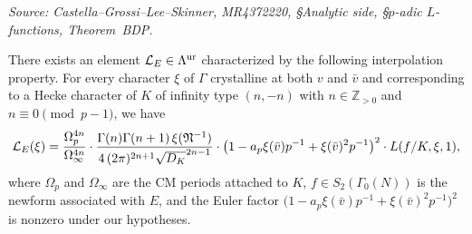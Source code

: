 \begin{theorem}
  \label{thm:BDP}
  \textit{Source: Castella--Grossi--Lee--Skinner, MR4372220, §Analytic side, \S{}\(p\)-adic \(L\)-functions, Theorem~BDP.}

  There exists an element \(\mathcal{L}_E \in \Lambda^{\mathrm{ur}}\) characterized by the following interpolation property. For every character \(\xi\) of \(\Gamma\) crystalline at both \(v\) and \(\bar{v}\) and corresponding to a Hecke character of \(K\) of infinity type \((n,-n)\) with \(n\in\mathbb{Z}_{>0}\) and \(n\equiv 0\pmod{p-1}\), we have
  \[
    \mathcal{L}_E(\xi)
    = \frac{\Omega_p^{4n}}{\Omega_\infty^{4n}}
      \cdot\frac{\Gamma(n)\Gamma(n+1)\,\xi(\mathfrak{N}^{-1})}{4\,(2\pi)^{2n+1}\sqrt{D_K}^{2n-1}}
      \cdot\bigl(1 - a_p\xi(\bar{v})p^{-1} + \xi(\bar{v})^2 p^{-1}\bigr)^2
      \cdot L(f/K,\xi,1),
  \]
  where \(\Omega_p\) and \(\Omega_\infty\) are the CM periods attached to \(K\), \(f\in S_2(\Gamma_0(N))\) is the newform associated with \(E\), and the Euler factor \(\bigl(1-a_p\xi(\bar{v})p^{-1}+\xi(\bar{v})^2p^{-1}\bigr)^2\) is nonzero under our hypotheses.
\end{theorem}


